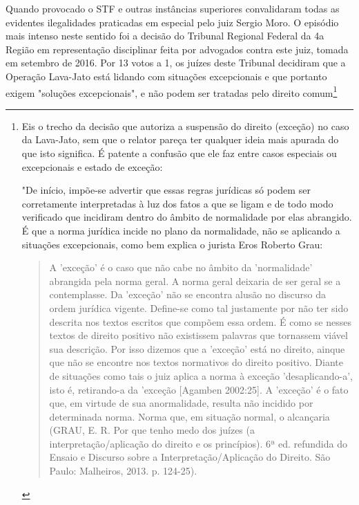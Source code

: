 Quando provocado o STF e outras instâncias superiores convalidaram todas
as evidentes ilegalidades praticadas em especial pelo juiz Sergio Moro.
O episódio mais intenso neste sentido foi a decisão do Tribunal Regional
Federal da 4a Região em representação disciplinar feita por advogados
contra este juiz, tomada em setembro de 2016. Por 13 votos a 1, os
juízes deste Tribunal decidiram que a Operação Lava-Jato está lidando
com situações excepcionais e que portanto exigem "soluções
excepcionais", e não podem ser tratadas pelo direito comum\footnote{Eis
  o trecho da decisão que autoriza a suspensão do direito (exceção) no
  caso da Lava-Jato, sem que o relator pareça ter qualquer ideia mais
  apurada do que isto significa. É patente a confusão que ele faz entre
  casos especiais ou excepcionais e estado de exceção:

  "De início, impõe-se advertir que essas regras jurídicas só podem ser
  corretamente interpretadas à luz dos fatos a que se ligam e de todo
  modo verificado que incidiram dentro do âmbito de normalidade por elas
  abrangido. É que a norma jurídica incide no plano da normalidade, não
  se aplicando a situações excepcionais, como bem explica o jurista Eros
  Roberto Grau:

  \begin{quote}
  A 'exceção' é o caso que não cabe no âmbito da 'normalidade' abrangida
  pela norma geral. A norma geral deixaria de ser geral se a
  contemplasse. Da 'exceção' não se encontra alusão no discurso da ordem
  jurídica vigente. Define-se como tal justamente por não ter sido
  descrita nos textos escritos que compõem essa ordem. É como se nesses
  textos de direito positivo não existissem palavras que tornassem
  viável sua descrição. Por isso dizemos que a 'exceção' está no
  direito, ainque que não se encontre nos textos normativos do direito
  positivo. Diante de situações como tais o juiz aplica a norma à
  exceção 'desaplicando-a', isto é, retirando-a da 'exceção {[}Agamben
  2002:25{]}. A 'exceção' é o fato que, em virtude de sua anormalidade,
  resulta não incidido por determinada norma. Norma que, em situação
  normal, o alcançaria (GRAU, E. R. Por que tenho medo dos juízes (a
  interpretação/aplicação do direito e os princípios). 6ª ed. refundida
  do Ensaio e Discurso sobre a Interpretação/Aplicação do Direito. São
  Paulo: Malheiros, 2013. p. 124-25).
  \end{quote}

}
